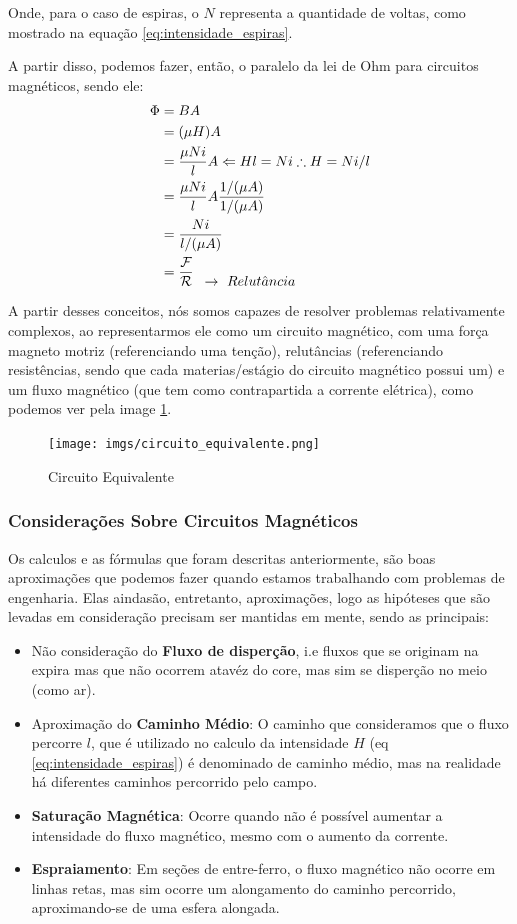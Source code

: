 \documentclass{article}
\newcommand{\n}{\nonumber \\ }
\begin{document}
Onde, para o caso de espiras, o $N$ representa a quantidade de voltas, como mostrado na equação \ref{eq:intensidade_espiras}.

A partir disso, podemos fazer, então, o paralelo da lei de Ohm para circuitos magnéticos, sendo ele:
\begin{align}
    \Phi &= B A \n 
         &= (\mu H) A \n 
         &= \frac{\mu N i}{l} A \Leftarrow Hl = Ni \therefore H = Ni/l \n
         &= \frac{\mu N i}{l} A \frac{1/(\mu A)}{1/(\mu A)} \n
         &= \frac{N i}{l/(\mu A)} \n
         &= \frac{\mathcal{F}}{\mathcal{R}} \ \ { \atop{\rightarrow \ Relut\hat{a}ncia}}
\end{align}


A partir desses conceitos, nós somos capazes de resolver problemas relativamente complexos, ao representarmos ele como um circuito magnético, com uma força magneto motriz (referenciando uma tenção), relutâncias (referenciando resistências, sendo que cada materias/estágio do circuito magnético possui um) e um fluxo magnético (que tem como contrapartida a corrente elétrica), como podemos ver pela image \ref{img:circuito_equivalente}.
\begin{figure}[h]
    \centering
    \texttt{[image: imgs/circuito\_equivalente.png]}
    \caption{Circuito Equivalente}
    \label{img:circuito_equivalente}
\end{figure}

\newpage
\subsubsection{Considerações Sobre Circuitos Magnéticos}
Os calculos e as fórmulas que foram descritas anteriormente, são boas aproximações que podemos fazer quando estamos trabalhando com problemas de engenharia. Elas aindasão, entretanto, aproximações, logo as hipóteses que são levadas em consideração precisam ser mantidas em mente, sendo as principais:

\begin{itemize}
    \item Não consideração do \textbf{Fluxo de disperção}, i.e fluxos que se originam na expira mas que não ocorrem atavéz do core, mas sim se disperção no meio (como ar).
    \item Aproximação do \textbf{Caminho Médio}: O caminho que consideramos que o fluxo percorre $l$, que é utilizado no calculo da intensidade $H$ (eq \ref{eq:intensidade_espiras}) é denominado de caminho médio, mas na realidade há diferentes caminhos percorrido pelo campo.
    \item \textbf{Saturação Magnética}: Ocorre quando não é possível aumentar a intensidade do fluxo magnético, mesmo com o aumento da corrente.
    \item \textbf{Espraiamento}: Em seções de entre-ferro, o fluxo magnético não ocorre em linhas retas, mas sim ocorre um alongamento do caminho percorrido, aproximando-se de uma esfera alongada.
\end{itemize}
\end{document}
